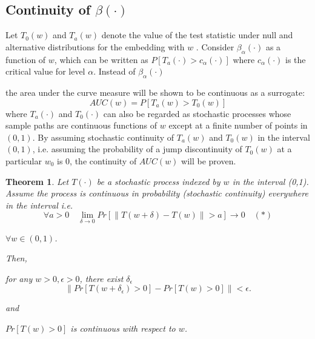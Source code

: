 \documentclass[11pt]{article} %
\newtheorem{thm}{Theorem}
\begin{document}
 
\subsection{Continuity of $\beta(\cdot)$} 
 Let $T_0(w)$ and $T_a(w)$ denote the value of the test statistic under null and alternative distributions  for the embedding with $w$ .  %
Consider $\beta_{\alpha}(\cdot)$ as a function of $w$, which can be written as $P\left[T_a(\cdot)>c_{\alpha}(\cdot)\right]$ where $c_{\alpha}(\cdot)$ is the critical value for level $\alpha$. Instead of  $\beta_{\alpha}(\cdot)$

  the area under the curve measure will be shown to be continuous as a surrogate: $$AUC(w)=P\left[T_a(w)>T_0(w)\right]$$ where $T_a(\cdot)$ and $T_0(\cdot)$ can also be regarded as  stochastic processes whose sample paths are continuous functions of $w$ except at a finite number of points in $(0,1)$. By  assuming stochastic continuity of $T_a(w)$ and $T_0(w)$ in the interval $(0,1)$, i.e. assuming the probability of a jump discontinuity of $T_0(w)$ at a particular $w_0$ is 0,  the continuity of $AUC(w)$ will be proven.


\begin{thm}
Let $T(\cdot)$ be  a stochastic process indexed by $w$ in the interval (0,1). Assume  the process is continuous in probability  (stochastic continuity)   everywhere in the interval  i.e.
$$ \forall a>0 \quad  \lim_{\delta \rightarrow 0} Pr\left[\|T(w+\delta)-T(w) \|>a \right] \rightarrow 0 \quad(*)$$ 

 $\forall w\in (0,1)$.

Then,

for any $w>0, \epsilon>0$, there exist $\delta_{\epsilon}$ $$\| Pr\left[T(w+\delta_{\epsilon})>0 \right]- Pr\left[T(w)>0 \right]\|<\epsilon .  $$

and 

$Pr \left[ T(w)>0\right]$ is continuous with respect to $w$.
\end{thm}
\end{document}
